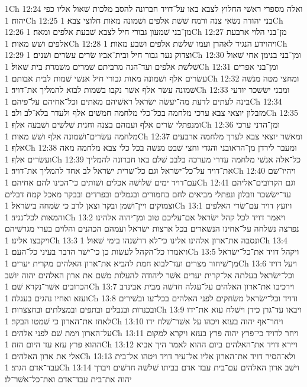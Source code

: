 1Ch 12:24  ואלה מספרי ראשׁי החלוץ לצבא באו על־דויד חברונה להסב מלכות שׁאול אליו כפי יהוה׃
1Ch 12:25  בני יהודה נשׂאי צנה ורמח שׁשׁת אלפים ושׁמונה מאות חלוצי צבא׃
1Ch 12:26  מן־בני שׁמעון גבורי חיל לצבא שׁבעת אלפים ומאה׃
1Ch 12:27  מן־בני הלוי ארבעת אלפים ושׁשׁ מאות׃
1Ch 12:28  ויהוידע הנגיד לאהרן ועמו שׁלשׁת אלפים ושׁבע מאות׃
1Ch 12:29  וצדוק נער גבור חיל ובית־אביו שׂרים עשׂרים ושׁנים׃
1Ch 12:30  ומן־בני בנימן אחי שׁאול שׁלשׁת אלפים ועד־הנה מרביתם שׁמרים משׁמרת בית שׁאול׃
1Ch 12:31  ומן־בני אפרים עשׂרים אלף ושׁמונה מאות גבורי חיל אנשׁי שׁמות לבית אבותם׃
1Ch 12:32  ומחצי מטה מנשׁה שׁמונה עשׂר אלף אשׁר נקבו בשׁמות לבוא להמליך את־דויד׃
1Ch 12:33  ומבני ישׂשכר יודעי בינה לעתים לדעת מה־יעשׂה ישׂראל ראשׁיהם מאתים וכל־אחיהם על־פיהם׃
1Ch 12:34  מזבלון יוצאי צבא ערכי מלחמה בכל־כלי מלחמה חמשׁים אלף ולעדר בלא־לב ולב׃
1Ch 12:35  ומנפתלי שׂרים אלף ועמהם בצנה וחנית שׁלשׁים ושׁבעה אלף׃
1Ch 12:36  ומן־הדני ערכי מלחמה עשׂרים־ושׁמונה אלף ושׁשׁ מאות׃
1Ch 12:37  ומאשׁר יוצאי צבא לערך מלחמה ארבעים אלף׃
1Ch 12:38  ומעבר לירדן מן־הראובני והגדי וחצי שׁבט מנשׁה בכל כלי צבא מלחמה מאה ועשׂרים אלף׃
1Ch 12:39  כל־אלה אנשׁי מלחמה עדרי מערכה בלבב שׁלם באו חברונה להמליך את־דויד על־כל־ישׂראל וגם כל־שׁרית ישׂראל לב אחד להמליך את־דויד׃
1Ch 12:40  ויהיו־שׁם עם־דויד ימים שׁלושׁה אכלים ושׁותים כי־הכינו להם אחיהם׃
1Ch 12:41  וגם הקרובים־אליהם עד־ישׂשכר וזבלון ונפתלי מביאים לחם בחמורים ובגמלים ובפרדים ובבקר מאכל קמח דבלים וצמוקים ויין־ושׁמן ובקר וצאן לרב כי שׂמחה בישׂראל׃
1Ch 13:1  ויועץ דויד עם־שׂרי האלפים והמאות לכל־נגיד׃
1Ch 13:2  ויאמר דויד לכל קהל ישׂראל אם־עליכם טוב ומן־יהוה אלהינו נפרצה נשׁלחה על־אחינו הנשׁארים בכל ארצות ישׂראל ועמהם הכהנים והלוים בערי מגרשׁיהם ויקבצו אלינו׃
1Ch 13:3  ונסבה את־ארון אלהינו אלינו כי־לא דרשׁנהו בימי שׁאול׃
1Ch 13:4  ויאמרו כל־הקהל לעשׂות כן כי־ישׁר הדבר בעיני כל־העם׃
1Ch 13:5  ויקהל דויד את־כל־ישׂראל מן־שׁיחור מצרים ועד־לבוא חמת להביא את־ארון האלהים מקרית יערים׃
1Ch 13:6  ויעל דויד וכל־ישׂראל בעלתה אל־קרית יערים אשׁר ליהודה להעלות משׁם את ארון האלהים יהוה יושׁב הכרובים אשׁר־נקרא שׁם׃
1Ch 13:7  וירכיבו את־ארון האלהים על־עגלה חדשׁה מבית אבינדב ועזא ואחיו נהגים בעגלה׃
1Ch 13:8  ודויד וכל־ישׂראל משׂחקים לפני האלהים בכל־עז ובשׁירים ובכנרות ובנבלים ובתפים ובמצלתים ובחצצרות׃
1Ch 13:9  ויבאו עד־גרן כידן וישׁלח עזא את־ידו לאחז את־הארון כי שׁמטו הבקר׃
1Ch 13:10  ויחר־אף יהוה בעזא ויכהו על אשׁר־שׁלח ידו על־הארון וימת שׁם לפני אלהים׃
1Ch 13:11  ויחר לדויד כי־פרץ יהוה פרץ בעזא ויקרא למקום ההוא פרץ עזא עד היום הזה׃
1Ch 13:12  ויירא דויד את־האלהים ביום ההוא לאמר היך אביא אלי את ארון האלהים׃
1Ch 13:13  ולא־הסיר דויד את־הארון אליו אל־עיר דויד ויטהו אל־בית עבד־אדם הגתי׃
1Ch 13:14  וישׁב ארון האלהים עם־בית עבד אדם בביתו שׁלשׁה חדשׁים ויברך יהוה את־בית עבד־אדם ואת־כל־אשׁר־לו׃
